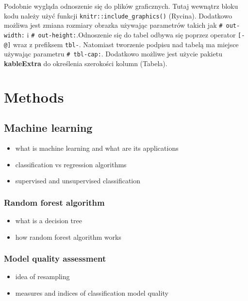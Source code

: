 \documentclass{amuthesis}
\begin{document}
Podobnie wygląda odnoszenie się do plików graficznych. Tutaj wewnątrz
bloku kodu należy użyć funkcji \texttt{knitr::include\_graphics()}
(Rycina). Dodatkowo możliwa jest zmiana rozmiary obrazka używając
parametrów takich jak \texttt{\#\textbar{}\ out-width:} i
\texttt{\#\textbar{}\ out-height:}.Odnoszenie się do tabel odbywa się
poprzez operator \texttt{{[}-@{]}} wraz z prefiksem \texttt{tbl-}.
Natomiast tworzenie podpisu nad tabelą ma miejsce używając parametru
\texttt{\#\textbar{}\ tbl-cap:}. Dodatkowo możliwe jest użycie pakietu
\textbf{kableExtra} \autocite{R-kableExtra} do określenia szerokości
kolumn (Tabela).


\hypertarget{sec-methods}{%
\chapter{Methods}\label{sec-methods}}

\hypertarget{sec-ml}{%
\section{Machine learning}\label{sec-ml}}

\begin{itemize}
\item
  what is machine learning and what are its applications
\item
  classification vs regression algorithms
\item
  supervised and unsupervised classification
\end{itemize}

\hypertarget{sec-rf}{%
\subsection{Random forest algorithm}\label{sec-rf}}

\begin{itemize}
\item
  what is a decision tree
\item
  how random forest algorithm works
\end{itemize}

\hypertarget{sec-resampling}{%
\subsection{Model quality assessment}\label{sec-resampling}}

\begin{itemize}
\item
  idea of resampling
\item
  measures and indices of classification model quality
\end{itemize}
\end{document}
